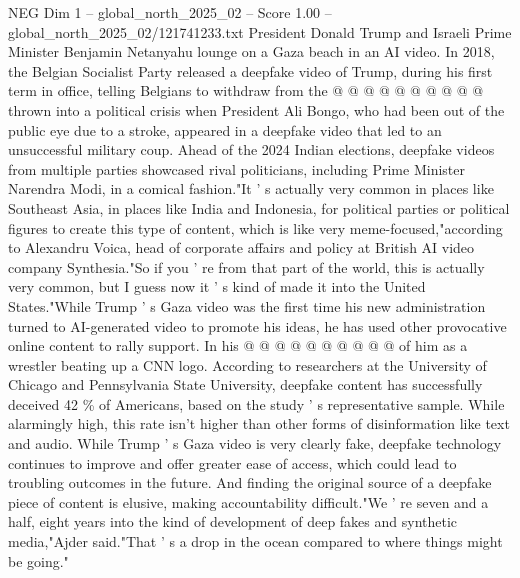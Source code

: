 \begin{textsample}{NEG Dim 1 – global\_north\_2025\_02 – Score 1.00 – global\_north\_2025\_02/121741233.txt}
President Donald Trump and Israeli Prime Minister Benjamin Netanyahu lounge on a Gaza beach in an AI video.
In 2018, the Belgian Socialist Party released a deepfake video of Trump, during his first term in office, telling Belgians to withdraw from the @ @ @ @ @ @ @ @ @ @ thrown into a political crisis when President Ali Bongo, who had been out of the public eye due to a stroke, appeared in a deepfake video that led to an unsuccessful military coup.
Ahead of the 2024 Indian elections, deepfake videos from multiple parties showcased rival politicians, including Prime Minister Narendra Modi, in a comical fashion."It ' s actually very common in places like Southeast Asia, in places like India and Indonesia, for political parties or political figures to create this type of content, which is like very meme-focused,"according to Alexandru Voica, head of corporate affairs and policy at British AI video company Synthesia."So if you ' re from that part of the world, this is actually very common, but I guess now it ' s kind of made it into the United States."While Trump ' s Gaza video was the first time his new administration turned to AI-generated video to promote his ideas, he has used other provocative online content to rally support.
In his @ @ @ @ @ @ @ @ @ @ of him as a wrestler beating up a CNN logo.
According to researchers at the University of Chicago and Pennsylvania State University, deepfake content has successfully deceived 42 \% of Americans, based on the study ' s representative sample.
While alarmingly high, this rate isn't higher than other forms of disinformation like text and audio.
While Trump ' s Gaza video is very clearly fake, deepfake technology continues to improve and offer greater ease of access, which could lead to troubling outcomes in the future.
And finding the original source of a deepfake piece of content is elusive, making accountability difficult."We ' re seven and a half, eight years into the kind of development of deep fakes and synthetic media,"Ajder said."That ' s a drop in the ocean compared to where things might be going."

\end{textsample}
